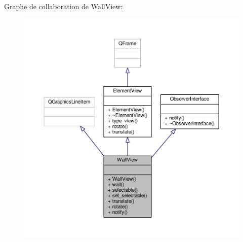 Graphe de collaboration de Wall\+View\+:
\nopagebreak
\begin{figure}[H]
\begin{center}
\leavevmode
\includegraphics[width=350pt]{d1/d8b/classWallView__coll__graph}
\end{center}
\end{figure}
